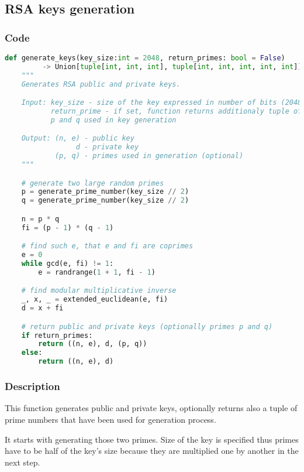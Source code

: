 \documentclass{article}
\begin{document}
\subsection{RSA keys generation}
\subsubsection{Code}

\small

\begin{lstlisting}[language=Python]
    def generate_keys(key_size:int = 2048, return_primes: bool = False)
         -> Union[tuple[int, int, int], tuple[int, int, int, int, int]]:
    """
    Generates RSA public and private keys.

    Input: key_size - size of the key expressed in number of bits (2048 bits by default)
           return_prime - if set, function returns additionaly tuple of prime numbers 
           p and q used in key generation

    Output: (n, e) - public key
                 d - private key
            (p, q) - primes used in generation (optional)
    """

    # generate two large random primes
    p = generate_prime_number(key_size // 2)
    q = generate_prime_number(key_size // 2)

    n = p * q
    fi = (p - 1) * (q - 1)

    # find such e, that e and fi are coprimes
    e = 0
    while gcd(e, fi) != 1:
        e = randrange(1 + 1, fi - 1)

    # find modular multiplicative inverse
    _, x, _ = extended_euclidean(e, fi)
    d = x + fi

    # return public and private keys (optionally primes p and q)
    if return_primes:
        return ((n, e), d, (p, q))
    else:
        return ((n, e), d)
\end{lstlisting}

\normalsize

\subsubsection{Description}
This function generates public and private keys, optionally returns also a tuple of prime
numbers that have been used for generation process.

It starts with generating those two primes. Size of the key is specified thus primes have
to be half of the key's size because they are multiplied one by another in the next step.
\end{document}
